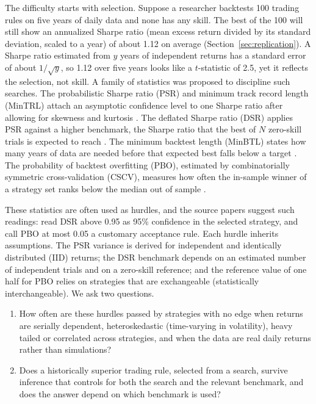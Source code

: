 \documentclass[11pt,a4paper]{article}
\begin{document}
The difficulty starts with selection. Suppose a researcher backtests 100 trading rules on five years of daily data and none has any skill. The best of the 100 will still show an annualized Sharpe ratio (mean excess return divided by its standard deviation, scaled to a year) of about 1.12 on average (Section~\ref{sec:replication}). A Sharpe ratio estimated from $y$ years of independent returns has a standard error of about $1/\sqrt y$, so 1.12 over five years looks like a $t$-statistic of 2.5, yet it reflects the selection, not skill. A family of statistics was proposed to discipline such searches. The probabilistic Sharpe ratio (PSR) and minimum track record length (MinTRL) attach an asymptotic confidence level to one Sharpe ratio after allowing for skewness and kurtosis \citep{bailey2012frontier}. The deflated Sharpe ratio (DSR) applies PSR against a higher benchmark, the Sharpe ratio that the best of $N$ zero-skill trials is expected to reach \citep{bailey2014dsr}. The minimum backtest length (MinBTL) states how many years of data are needed before that expected best falls below a target \citep{bailey2014pseudo}. The probability of backtest overfitting (PBO), estimated by combinatorially symmetric cross-validation (CSCV), measures how often the in-sample winner of a strategy set ranks below the median out of sample \citep{bailey2017pbo}.

These statistics are often used as hurdles, and the source papers suggest such readings: \citet[p.~10]{bailey2014dsr} read DSR above 0.95 as 95\% confidence in the selected strategy, and \citet[p.~14]{bailey2017pbo} call PBO at most 0.05 a customary acceptance rule. Each hurdle inherits assumptions. The PSR variance is derived for independent and identically distributed (IID) returns; the DSR benchmark depends on an estimated number of independent trials and on a zero-skill reference; and the reference value of one half for PBO relies on strategies that are exchangeable (statistically interchangeable). We ask two questions.

\begin{enumerate}
\item[\textbf{Q1.}] How often are these hurdles passed by strategies with no edge when returns are serially dependent, heteroskedastic (time-varying in volatility), heavy tailed or correlated across strategies, and when the data are real daily returns rather than simulations?
\item[\textbf{Q2.}] Does a historically superior trading rule, selected from a search, survive inference that controls for both the search and the relevant benchmark, and does the answer depend on which benchmark is used?
\end{enumerate}
\end{document}
